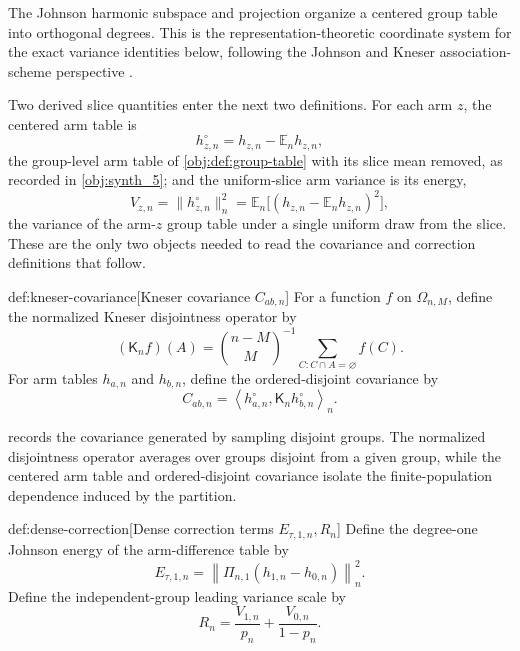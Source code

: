 The Johnson harmonic subspace  and projection  organize a centered group table into orthogonal degrees. This is the representation-theoretic coordinate system for the exact variance identities below, following the Johnson and Kneser association-scheme perspective \citep{Filmus2016,BrouwerEtAl2018}.

Two derived slice quantities enter the next two definitions. For each arm \(z\), the centered arm table is
\[
h_{z,n}^{\circ}=h_{z,n}-\mathbb E_n h_{z,n},
\]
the group-level arm table of \cref{obj:def:group-table} with its slice mean removed, as recorded in \cref{obj:synth_5}; and the uniform-slice arm variance is its energy,
\[
V_{z,n}=\|h_{z,n}^{\circ}\|_n^2=\mathbb E_n\bigl[(h_{z,n}-\mathbb E_n h_{z,n})^2\bigr],
\]
the variance of the arm-\(z\) group table under a single uniform draw from the slice. These are the only two objects needed to read the covariance and correction definitions that follow.

\begin{definitionv}{def:kneser-covariance}[Kneser covariance \(C_{ab,n}\)]
For a function \(f\) on \(\Omega_{n,M}\), define the normalized Kneser disjointness operator by
\[
(\mathsf K_n f)(A)
=
\binom{n-M}{M}^{-1}
\sum_{C:C\cap A=\varnothing} f(C).
\]
For arm tables \(h_{a,n}\) and \(h_{b,n}\), define the ordered-disjoint covariance by
\[
C_{ab,n}
=
\left\langle h_{a,n}^{\circ},\mathsf K_n h_{b,n}^{\circ}\right\rangle_n .
\]
\end{definitionv}

 records the covariance generated by sampling disjoint groups. The normalized disjointness operator  averages over groups disjoint from a given group, while the centered arm table  and ordered-disjoint covariance  isolate the finite-population dependence induced by the partition.

\begin{definitionv}{def:dense-correction}[Dense correction terms \(E_{\tau,1,n},R_n\)]
Define the degree-one Johnson energy of the arm-difference table by
\[
E_{\tau,1,n}
=
\left\|\Pi_{n,1}(h_{1,n}-h_{0,n})\right\|_n^2 .
\]
Define the independent-group leading variance scale by
\[
R_n
=
\frac{V_{1,n}}{p_n}
+
\frac{V_{0,n}}{1-p_n}.
\]
\end{definitionv}

